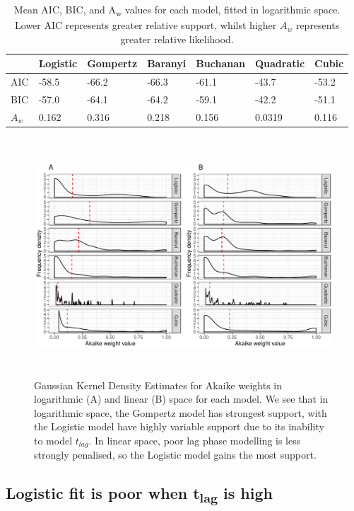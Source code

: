 \documentclass[11pt, a4paper]{article}
\begin{document}
\begin{linenumbers}
         \begin{table}[H]
\centering
\begin{tabular}{l|llllll}
       & Logistic & Gompertz & Baranyi & Buchanan & Quadratic & Cubic \\ \hline
AIC & -58.5    & -66.2    & -66.3   & -61.1    & -43.7     & -53.2 \\
BIC & -57.0    & -64.1    & -64.2   & -59.1    & -42.2     & -51.1 \\
$A_w$ & 0.162     & 0.316     & 0.218   & 0.156     & 0.0319     & 0.116
\end{tabular}
\caption{Mean AIC, BIC, and A\textsubscript{w}  values for each model, fitted in logarithmic space. Lower AIC represents greater relative support, whilst higher $A_w$ represents greater relative likelihood.}
\label{tab:meanAICBIC}
\end{table}




        \begin{figure}[H]
        \includegraphics[height=3.5in]{../results/Aw_distributions.pdf}
        \caption{Gaussian Kernel Density Estimates for Akaike weights in logarithmic (A) and linear (B) space for each model. We see that in logarithmic space, the Gompertz model has strongest support, with the Logistic model have highly variable support due to its inability to model $t_{lag}$. In linear space, poor lag phase modelling is less strongly penalised, so the Logistic model gains the most support. }
        \label{fig:AWdist}
        \end{figure}
        
        

        
        \subsection{Logistic fit is poor when t\textsubscript{lag} is high}
                

\end{linenumbers}
\end{document}
